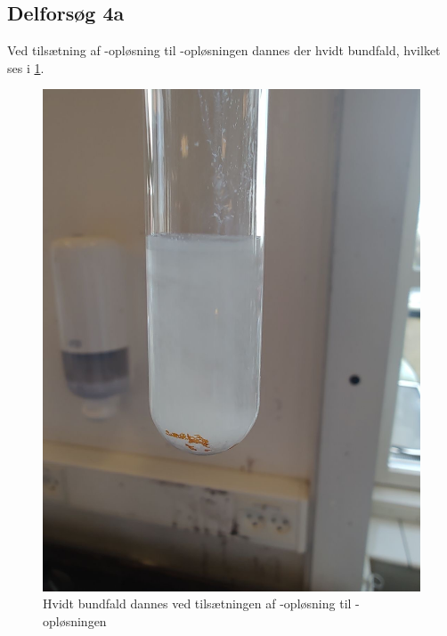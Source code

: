 \documentclass{report}
\begin{document}
\subsection*{Delforsøg 4a}
Ved tilsætning af -opløsning til -opløsningen dannes der hvidt bundfald, hvilket ses i \cref{fig:for4a}.
\begin{figure}[H]
\begin{center}
  \includegraphics[scale=0.18]{for4a.jpeg}
\end{center}
\caption{Hvidt bundfald dannes ved tilsætningen af -opløsning til -opløsningen}
\label{fig:for4a}
\end{figure}
\end{document}
